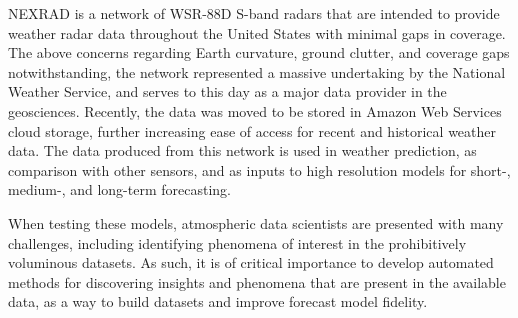 NEXRAD is a network of WSR-88D S-band radars that are intended to provide weather radar data throughout the United States with minimal gaps in coverage. 
The above concerns regarding Earth curvature, ground clutter, and coverage gaps notwithstanding, the network represented a massive undertaking by the National Weather Service, and serves to this day as a major data provider in the geosciences. 
Recently, the data was moved to be stored in Amazon Web Services cloud storage, further increasing ease of access for recent and historical weather data. 
The data produced from this network is used in weather prediction, as comparison with other sensors, and as inputs to high resolution models for short-, medium-, and long-term forecasting.

When testing these models, atmospheric data scientists are presented with many challenges, including identifying phenomena of interest in the prohibitively voluminous datasets. 
As such, it is of critical importance to develop automated methods for discovering insights and phenomena that are present in the available data, as a way to build datasets and improve forecast model fidelity.
